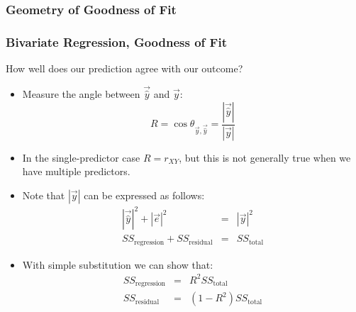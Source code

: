 \documentclass{beamer}
\begin{document}
\begin{frame}
  \frametitle{Geometry of Goodness of Fit}

\begin{figure}
\begin{center}
\end{center}
\end{figure}

\end{frame}


\begin{frame}
  \frametitle{Bivariate Regression, Goodness of Fit}

How well does our prediction agree with our outcome?

\begin{itemize}
  \item Measure the angle between $\vec{\widehat{y}}$ and $\vec{y}$:
\[
R = \cos \theta_{\vec{y},\vec{\widehat{y}}} = \frac{|\vec{\widehat{y}}|}{|\vec{y}|}
\]

 \item In the single-predictor case $R = r_{XY}$, but this is not generally true when we have multiple predictors.

 \item Note that $|\vec{y}|$ can be expressed as follows:
\begin{eqnarray*}
|\vec{\widehat{y}}|^2 + |\vec{e}|^2 &=& |\vec{y}|^2 \\
SS_\mathrm{regression} + SS_\mathrm{residual} &=& SS_\mathrm{total}
\end{eqnarray*}

 \item With simple substitution we can show that:
\begin{eqnarray*}
SS_\mathrm{regression} &=& R^2 SS_\mathrm{total} \\
SS_\mathrm{residual} &=& (1-R^2)SS_\mathrm{total}
\end{eqnarray*}

\end{itemize}


\end{frame}
\end{document}
